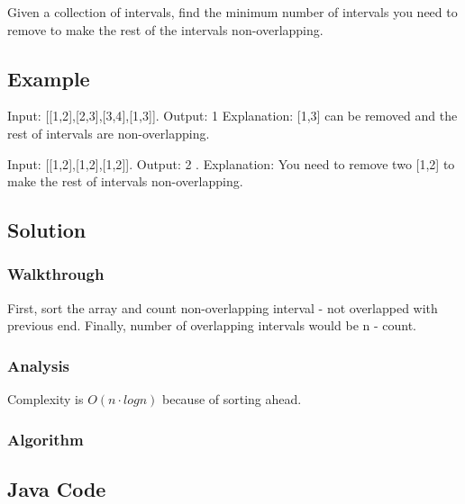 \documentclass[]{book}
\begin{document}
Given a collection of intervals, find the minimum number of intervals you need to remove to make the rest of the
intervals non-overlapping.

\hypertarget{example-18}{%
\subsection{Example}\label{example-18}}

Input: {[}{[}1,2{]},{[}2,3{]},{[}3,4{]},{[}1,3{]}{]}. Output: 1 Explanation: {[}1,3{]} can be removed and the rest of intervals are
non-overlapping.

Input: {[}{[}1,2{]},{[}1,2{]},{[}1,2{]}{]}. Output: 2 . Explanation: You need to remove two {[}1,2{]} to make the rest of intervals
non-overlapping.

\hypertarget{solution-14}{%
\subsection{Solution}\label{solution-14}}

\hypertarget{walkthrough-18}{%
\subsubsection{Walkthrough}\label{walkthrough-18}}

First, sort the array and count non-overlapping interval - not overlapped with previous end. Finally, number of
overlapping intervals would be n - count.

\hypertarget{analysis-20}{%
\subsubsection{Analysis}\label{analysis-20}}

Complexity is \(O(n \cdot log n)\) because of sorting ahead.

\hypertarget{algorithm-20}{%
\subsubsection{Algorithm}\label{algorithm-20}}

\hypertarget{java-code-16}{%
\subsection{Java Code}\label{java-code-16}}
\end{document}
